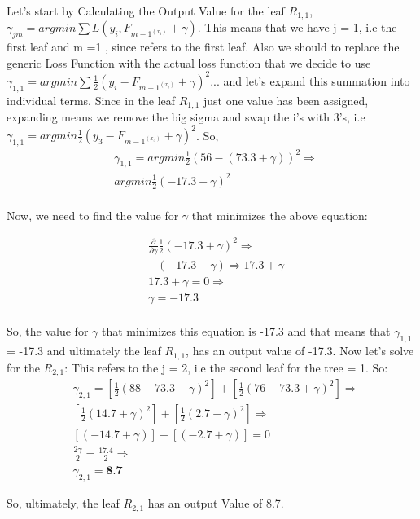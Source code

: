 \documentclass[12pt, a4paper]{article} %
\begin{document}
Let's start by Calculating the Output Value for the leaf $R_{1, 1}$, $\gamma_{jm} = argmin \sum L(y_{i}, F_{m - 1^(x_{i})} + \gamma)$. This means that we have j = 1, i.e the first leaf and m =1 , since refers to the first leaf. Also we should to replace the generic Loss Function with the actual loss function that we decide to use $\gamma_{1,1} = argmin \sum \frac{1}{2}(y_{i} - F_{m - 1^(x_{i})} + \gamma )^2$... and let's expand this summation into individual terms. Since in the leaf $R_{1, 1}$ just one value has been assigned, expanding means we remove the big sigma and swap the i's with 3's, i.e  $\gamma_{1,1} = argmin  \frac{1}{2}(y_{3} - F_{m - 1^(x_{3})} + \gamma )^2$. So, 
\begin{align*}
    & \gamma_{1, 1} = argmin \frac{1}{2}(56 - (73.3 + \gamma))^2 \Rightarrow \\
    & argmin \frac{1}{2}(-17.3 + \gamma)^2\\
\end{align*}

Now, we need to find the value for $\gamma$ that minimizes the above equation:

\begin{align*}
    & \frac{\partial}{\partial \gamma} \frac{1}{2}(-17.3 + \gamma)^2 \Rightarrow\\
    & -(-17.3 + \gamma) \Rightarrow 17.3 + \gamma\\
    & 17.3 + \gamma = 0 \Rightarrow\\
    & \gamma = -17.3\\
\end{align*}

So, the value for $\gamma$ that minimizes this equation is -17.3 and that means that $\gamma_{1, 1}$ = -17.3 and ultimately the leaf $R_{1, 1}$, has an output value of -17.3.
Now let's solve for the $R_{2, 1}$: This refers to the j = 2, i.e the second leaf for the tree = 1. So:
\begin{align*}
    & \gamma_{2, 1} = [\frac{1}{2}(88 - 73.3 +   \gamma)^2] + [\frac{1}{2}(76 - 73.3 + \gamma)^2] \Rightarrow\\
    & [\frac{1}{2}(14.7 + \gamma)^2] + [\frac{1}{2}(2.7 + \gamma)^2] \Rightarrow\\
    & [(-14.7 + \gamma)] + [(-2.7 + \gamma)] = 0\\
    & \frac{2 \gamma}{2} = \frac{17.4}{2} \Rightarrow\\
    & \gamma_{2, 1} = \textbf{8.7}
\end{align*}

So, ultimately, the leaf $R_{2, 1}$ has an output Value of 8.7.
\end{document}
